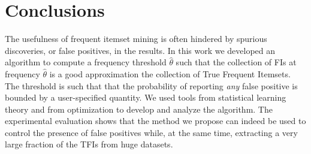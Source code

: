 \section{Conclusions}\label{sec:concl}
The usefulness of frequent itemset mining is often hindered by spurious discoveries,
or false positives, in the results. In this work we developed an algorithm to compute
a frequency threshold
$\hat\theta$ such that the collection of FIs at frequency $\hat\theta$ is a
good approximation the collection of True Frequent Itemsets. The threshold is
such that that the probability of reporting \emph{any} false positive
is bounded by a user-specified quantity. We used tools from statistical learning
theory and from optimization to develop and analyze the algorithm. The
experimental evaluation shows that the method we propose
can indeed be used to control the presence of false positives while, at the
same time, extracting a very large fraction of the TFIs from huge datasets. 
%
% 
